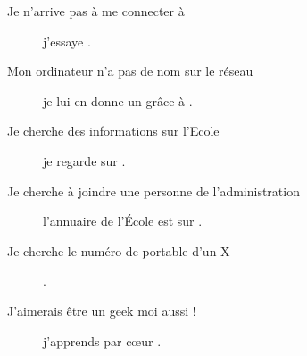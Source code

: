 \begin{description}
\item[Je n'arrive pas à me connecter à ] j'essaye .

\item[Mon ordinateur n'a pas de nom sur le réseau] je lui en donne un gr\^ace \`a  .

\item[Je cherche des informations sur l'Ecole] je regarde sur .

\item[Je cherche à joindre une personne de l'administration] l'annuaire de l'École est sur \linebreak{} .

\item[Je cherche le numéro de portable d'un X] .

\item[J'aimerais être un geek moi aussi !] j'apprends par c\oe ur .

\end{description}
